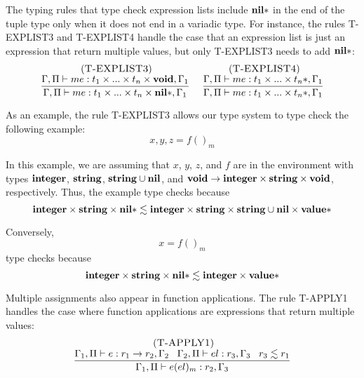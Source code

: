 The typing rules that type check expression lists include $\mathbf{nil}{*}$
in the end of the tuple type only when it does not end in a variadic type.
For instance, the rules \textsc{T-EXPLIST3} and \textsc{T-EXPLIST4}
handle the case that an expression list is just an expression that
return multiple values, but only \textsc{T-EXPLIST3} needs to add
$\mathbf{nil}{*}$:
\[
\begin{array}{c}
\begin{array}{c}
\; (\textsc{T-EXPLIST3})\\
\dfrac{\Gamma, \Pi \vdash me:t_{1} \times ... \times t_{n} \times \mathbf{void}, \Gamma_{1}}
      {\Gamma, \Pi \vdash me:t_{1} \times ... \times t_{n} \times \mathbf{nil}{*}, \Gamma_{1}}
\end{array}
\;
\begin{array}{c}
\; (\textsc{T-EXPLIST4})\\
\dfrac{\Gamma, \Pi \vdash me:t_{1} \times ... \times t_{n}{*}, \Gamma_{1}}
      {\Gamma, \Pi \vdash me:t_{1} \times ... \times t_{n}{*}, \Gamma_{1}}
\end{array}
\end{array}
\]

As an example, the rule \textsc{T-EXPLIST3} allows our type system
to type check the following example:
\[
x, y, z = f()_{m}
\]

In this example, we are assuming that $x$, $y$, $z$, and $f$ are in
the environment with types $\mathbf{integer}$, $\mathbf{string}$, $\mathbf{string} \cup \mathbf{nil}$, and
$\mathbf{void} \rightarrow \mathbf{integer} \times \mathbf{string} \times \mathbf{void}$, respectively.
Thus, the example type checks because
\[
\mathbf{integer} \times \mathbf{string} \times \mathbf{nil}{*} \lesssim \mathbf{integer} \times \mathbf{string} \times \mathbf{string} \cup \mathbf{nil} \times \mathbf{value}{*}
\]

Conversely,
\[
x = f()_{m}
\]
type checks because
\[
\mathbf{integer} \times \mathbf{string} \times \mathbf{nil}{*} \lesssim \mathbf{integer} \times \mathbf{value}{*}
\]

Multiple assignments also appear in function applications.
The rule \textsc{T-APPLY1} handles the case where function applications
are expressions that return multiple values:
\[
\begin{array}{c}
\; (\textsc{T-APPLY1})\\
\dfrac{\Gamma_{1}, \Pi \vdash e:r_{1} \rightarrow r_{2}, \Gamma_{2} \;\;\;
       \Gamma_{2}, \Pi \vdash el:r_{3}, \Gamma_{3} \;\;\;
       r_{3} \lesssim r_{1}}
      {\Gamma_{1}, \Pi \vdash e(el)_{m}:r_{2}, \Gamma_{3}}
\end{array}
\]

